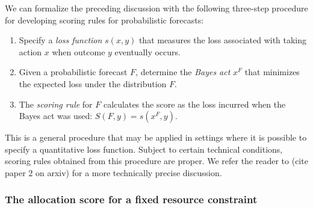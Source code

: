 \documentclass{article}\usepackage[]{graphicx}\usepackage[]{xcolor}
\def\elr#1{{\color{cyan}\textbf{ELR:[#1]}}}
\begin{document}
We can formalize the preceding discussion with the following three-step procedure for developing scoring rules for probabilistic forecasts:
\begin{enumerate}
\item Specify a \emph{loss function} $s(x, y)$ that measures the loss associated with taking action $x$ when outcome $y$ eventually occurs.
\item Given a probabilistic forecast $F$, determine the \emph{Bayes act} $x^F$ that minimizes the expected loss under the distribution $F$.
\item The \emph{scoring rule} for $F$ calculates the score as the loss incurred when the Bayes act was used: $S(F, y) = s(x^F, y)$.
\end{enumerate}
This is a general procedure that may be applied in settings where it is possible to specify a quantitative loss function. Subject to certain technical conditions, scoring rules obtained from this procedure are proper. We refer the reader to (cite paper 2 on arxiv) for a more technically precise discussion.

\subsubsection{The allocation score for a fixed resource constraint}
\label{sec:methods.detailed.specific_allocation}
\end{document}
